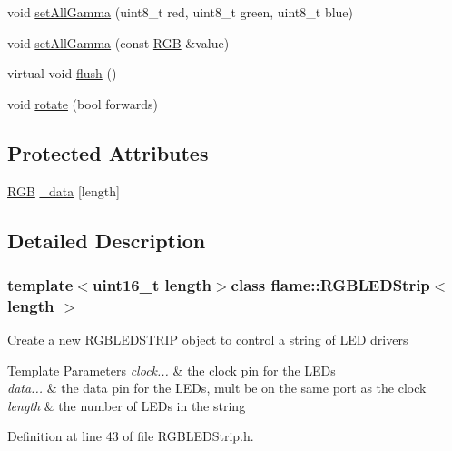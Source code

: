 \begin{DoxyCompactItemize}
\item 
void \hyperlink{classflame_1_1_r_g_b_l_e_d_strip_a83de29ee761868e72cdf2801b7a4a528}{set\-All\-Gamma} (uint8\-\_\-t red, uint8\-\_\-t green, uint8\-\_\-t blue)
\item 
void \hyperlink{classflame_1_1_r_g_b_l_e_d_strip_ae8f275e46abd0e95611d2cedd4dcaf24}{set\-All\-Gamma} (const \hyperlink{classflame_1_1_r_g_b}{R\-G\-B} \&value)
\item 
virtual void \hyperlink{classflame_1_1_r_g_b_l_e_d_strip_a4b30397b84e60b9f14bd3bef3129a60b}{flush} ()
\item 
void \hyperlink{classflame_1_1_r_g_b_l_e_d_strip_a646f80351e6a34b35d05fdb8882345c2}{rotate} (bool forwards)
\end{DoxyCompactItemize}
\subsection*{Protected Attributes}
\begin{DoxyCompactItemize}
\item 
\hyperlink{classflame_1_1_r_g_b}{R\-G\-B} \hyperlink{classflame_1_1_r_g_b_l_e_d_strip_a1f62d01c2151068509acafcaf74b04be}{\-\_\-data} \mbox{[}length\mbox{]}
\end{DoxyCompactItemize}


\subsection{Detailed Description}
\subsubsection*{template$<$uint16\-\_\-t length$>$class flame\-::\-R\-G\-B\-L\-E\-D\-Strip$<$ length $>$}

Create a new R\-G\-B\-L\-E\-D\-S\-T\-R\-I\-P object to control a string of L\-E\-D drivers 
\begin{DoxyTemplParams}{Template Parameters}
{\em clock...} & the clock pin for the L\-E\-Ds \\
\hline
{\em data...} & the data pin for the L\-E\-Ds, mult be on the same port as the clock \\
\hline
{\em length} & the number of L\-E\-Ds in the string \\
\hline
\end{DoxyTemplParams}


Definition at line 43 of file R\-G\-B\-L\-E\-D\-Strip.\-h.



